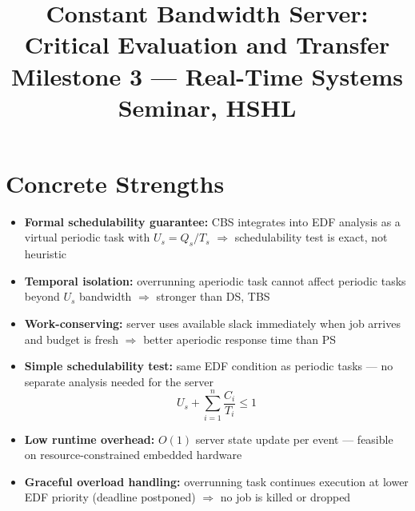 \documentclass[conference]{IEEEtran}
\begin{document}
\title{Constant Bandwidth Server: Critical Evaluation and Transfer\\
{\footnotesize Milestone 3 --- Real-Time Systems Seminar, HSHL}}

\author{
}

\maketitle

\section{Concrete Strengths}


\begin{itemize}
  \item \textbf{Formal schedulability guarantee:}
        CBS integrates into EDF analysis as a virtual periodic task with
        $U_s = Q_s/T_s$ $\Rightarrow$ schedulability test is exact,
        not heuristic
  \item \textbf{Temporal isolation:}
        overrunning aperiodic task cannot affect periodic tasks beyond
        $U_s$ bandwidth $\Rightarrow$ stronger than DS, TBS
  \item \textbf{Work-conserving:}
        server uses available slack immediately when job arrives and
        budget is fresh $\Rightarrow$ better aperiodic response time
        than PS
  \item \textbf{Simple schedulability test:}
        same EDF condition as periodic tasks --- no separate analysis
        needed for the server
        \begin{equation}
          U_s + \sum_{i=1}^{n} \frac{C_i}{T_i} \leq 1
        \end{equation}
  \item \textbf{Low runtime overhead:}
        $O(1)$ server state update per event --- feasible on
        resource-constrained embedded hardware
  \item \textbf{Graceful overload handling:}
        overrunning task continues execution at lower EDF priority
        (deadline postponed) $\Rightarrow$ no job is killed or dropped
\end{itemize}
\end{document}
